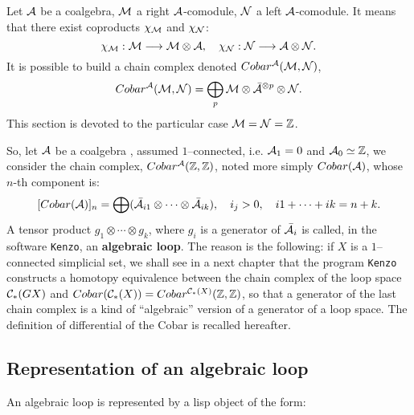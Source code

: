Let ${\cal A}$ be a coalgebra, ${\cal M}$ a  right ${\cal A}$-comodule, ${\cal N}$ a left ${\cal A}$-comodule.
It means that there exist coproducts $\chi_{\cal M}$ and $\chi_{\cal N}$:
$$\chi_{\cal M}: {\cal M} \longrightarrow {\cal M}\otimes {\cal A},\quad
  \chi_{\cal N}: {\cal N} \longrightarrow {\cal A}\otimes {\cal N}.  $$
It is possible to build a chain complex denoted $Cobar^{\cal A}({\cal M}, {\cal N})$,
$$Cobar^{\cal A}({\cal M}, {\cal N}) = \bigoplus_p
{\cal M}\otimes {\bar{\cal A}}^{\otimes p} \otimes {\cal N}.$$
This section  is devoted to the particular case ${\cal M}={\cal N}={\mathbb{Z}}$.
\par
So, let ${\cal A}$ be  a coalgebra , assumed $1$--connected,
i.e. ${\cal A}_1 = 0$ and  ${\cal A}_0 \simeq {\mathbb{Z}}$,
we consider the chain complex, $Cobar^{{\cal A}}({\mathbb{Z}}, {\mathbb{Z}})$, noted more simply  $Cobar({\cal A})$,
whose $n$-th component is:
$$ [Cobar({\cal A})]_n = \bigoplus ({\bar{\cal A}}_{i1} \otimes \cdots \otimes {\bar{\cal A}}_{ik}),\quad i_j >0, \quad
i1 + \cdots + ik= n+k.$$
A tensor product $g_1 \otimes \cdots \otimes g_k$, where
$g_i$ is a generator of ${\bar{\cal A}}_{i}$ is called, in the software {\tt Kenzo},
an {\bf algebraic loop}.
The reason is the following: if $X$ is a $1$--connected simplicial set, we shall see in a next
chapter that the program {\tt Kenzo} constructs
a homotopy equivalence between the chain complex of the loop space ${\cal C}_*(GX)$
and $Cobar({\cal C}_*(X)) = Cobar^{{\cal C}_*(X)}({\mathbb{Z}}, {\mathbb{Z}})$,
so that a generator of the last chain complex is a kind of ``algebraic'' version of a generator of a loop space.
The definition of  differential of the Cobar is recalled hereafter.


\subsection {Representation of an algebraic loop}

An algebraic loop is represented by a lisp object of the form:

